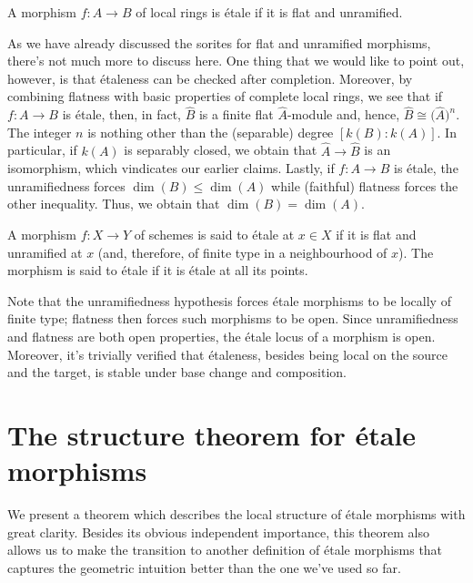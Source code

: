 \begin{definition}
\label{definition-etale-ring}
A morphism $f:A \to B$ of local rings is \'etale if it is flat and unramified.
\end{definition}

\noindent
As we have already discussed the sorites for flat and unramified morphisms,
there's not much more to discuss here. One thing that we would like to point
out, however, is that \'etaleness can be checked after completion. Moreover,
by combining flatness with basic properties of complete local rings, we see
that if $f:A \to B$ is \'etale, then, in fact, $\widehat{B}$ is a finite flat
$\widehat{A}$-module and, hence, $\widehat{B} \cong \big(\widehat{A}\big)^n$.
The integer $n$ is nothing other than the (separable) degree $[k(B):k(A)]$.
In particular, if $k(A)$ is separably closed, we obtain that
$\widehat{A} \to \widehat{B}$ is an isomorphism, which vindicates our earlier
claims. Lastly, if $f:A \to B$ is \'etale, the unramifiedness forces
$\dim(B) \leq  \dim(A)$ while (faithful) flatness forces the other
inequality. Thus, we obtain that $\dim(B) = \dim(A)$.

\begin{definition}
\label{definition-etale-schemes-1}
A morphism $f:X \to Y$ of schemes is said to \'etale at $x \in X$ if it is
flat and unramified at $x$ (and, therefore, of finite type in a neighbourhood
of $x$). The morphism is said to \'etale if it is \'etale at all its points.
\end{definition}

\noindent
Note that the unramifiedness hypothesis forces \'etale morphisms to be
locally of finite type; flatness then forces such morphisms to be open.
Since unramifiedness and flatness are both open properties, the \'etale
locus of a morphism is open. Moreover, it's trivially verified that
\'etaleness, besides being local on the source and the target, is stable
under base change and composition. 

\section{The structure theorem for \'etale morphisms}
\label{section-structure-etale-map}

\noindent
We present a theorem which describes the local structure of \'etale morphisms
with great clarity. Besides its obvious independent importance, this theorem
also allows us to make the transition to another definition of \'etale
morphisms that captures the geometric intuition better than the one we've
used so far. 

